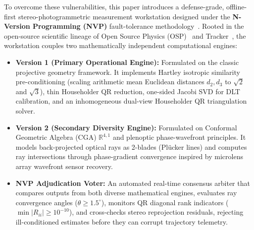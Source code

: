 \documentclass[journal]{IEEEtran}
\begin{document}
To overcome these vulnerabilities, this paper introduces a defense-grade, offline-first stereo-photogrammetric measurement workstation designed under the \textbf{N-Version Programming (NVP)} fault-tolerance methodology~\cite{avizienis1995methodology}. Rooted in the open-source scientific lineage of Open Source Physics (OSP)~\cite{christian2006physlet} and Tracker~\cite{brown2009tracker}, the workstation couples two mathematically independent computational engines:
\begin{itemize}
    \item \textbf{Version 1 (Primary Operational Engine):} Formulated on the classic projective geometry framework. It implements Hartley isotropic similarity pre-conditioning (scaling arithmetic mean Euclidean distances $d_2, d_3$ to $\sqrt{2}$ and $\sqrt{3}$), thin Householder QR reduction, one-sided Jacobi SVD for DLT calibration, and an inhomogeneous dual-view Householder QR triangulation solver.
    \item \textbf{Version 2 (Secondary Diversity Engine):} Formulated on Conformal Geometric Algebra (CGA) $\mathbb{R}^{4,1}$ and plenoptic phase-wavefront principles. It models back-projected optical rays as 2-blades (Plücker lines) and computes ray intersections through phase-gradient convergence inspired by microlens array wavefront sensor recovery.
    \item \textbf{NVP Adjudication Voter:} An automated real-time consensus arbiter that compares outputs from both diverse mathematical engines, evaluates ray convergence angles ($\theta \ge 1.5^\circ$), monitors QR diagonal rank indicators ($\min |R_{ii}| \ge 10^{-10}$), and cross-checks stereo reprojection residuals, rejecting ill-conditioned estimates before they can corrupt trajectory telemetry.
\end{itemize}
\end{document}
